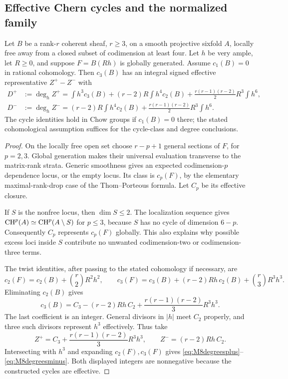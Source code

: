 \subsection{Effective Chern cycles and the normalized family}

\begin{proposition}\label{M8}
Let $B$ be a rank-$r$ coherent sheaf, $r\ge3$, on a smooth projective sixfold $A$,
locally free away from a closed subset of codimension at least four.
Let $h$ be very ample, let $R\ge0$, and suppose $F=B(Rh)$ is globally
generated. Assume $c_1(B)=0$ in rational cohomology. Then $c_3(B)$ has
an integral signed effective representative $Z^+-Z^-$ with
\begin{align}
 D^+&:=\deg_h Z^+
   =\int h^3c_3(B)+(r-2)R\int h^4c_2(B)
       +\frac{r(r-1)(r-2)}2R^3\int h^6,\label{eq:M8degreesplus}\\
 D^-&:=\deg_h Z^-
   =(r-2)R\int h^4c_2(B)
       +\frac{r(r-1)(r-2)}2R^3\int h^6.\label{eq:M8degreesminus}
\end{align}
The cycle identities hold in Chow groups if $c_1(B)=0$ there; the
stated cohomological assumption suffices for the cycle-class and
degree conclusions.
\end{proposition}
\begin{proof}
On the locally free open set choose $r-p+1$ general sections of $F$,
for $p=2,3$. Global generation makes their universal evaluation
transverse to the matrix-rank strata. Generic smoothness gives an
expected codimension-$p$ dependence locus, or the empty locus.
Its class is $c_p(F)$, by the elementary maximal-rank-drop case of
the Thom--Porteous formula. Let $C_p$ be its effective closure.

If $S$ is the nonfree locus, then $\dim S\le2$.
The localization sequence gives
$\operatorname{CH}^p(A)\simeq\operatorname{CH}^p(A\setminus S)$ for $p\le3$, because
$S$ has no cycle of dimension $6-p$. Consequently $C_p$ represents
$c_p(F)$ globally. This also explains why possible excess loci
inside $S$ contribute no unwanted codimension-two or codimension-three
terms.

The twist identities, after passing to the stated cohomology if
necessary, are
\[
 c_2(F)=c_2(B)+\binom r2R^2h^2,\qquad
 c_3(F)=c_3(B)+(r-2)Rh\,c_2(B)+\binom r3R^3h^3.
\]
Eliminating $c_2(B)$ gives
\begin{equation}\label{eq:M8cycleidentity}
 c_3(B)=C_3-(r-2)Rh\,C_2+
                \frac{r(r-1)(r-2)}3R^3h^3.
\end{equation}
The last coefficient is an integer. General divisors in $|h|$ meet
$C_2$ properly, and three such divisors represent $h^3$ effectively.
Thus take
\[
 Z^+=C_3+\frac{r(r-1)(r-2)}3R^3h^3,\qquad
 Z^-=(r-2)Rh\,C_2.
\]
Intersecting with $h^3$ and expanding $c_2(F),c_3(F)$ gives
\eqref{eq:M8degreesplus}--\eqref{eq:M8degreesminus}.
Both displayed integers are nonnegative because the constructed
cycles are effective.
\end{proof}

